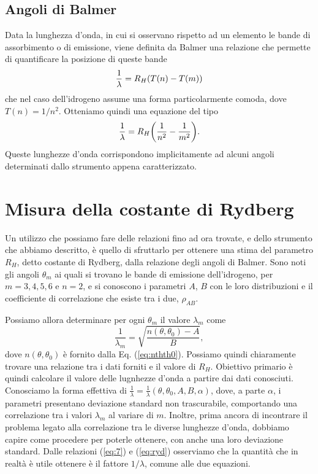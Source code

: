 \documentclass[a4paper,aps,12pt,tightenlines]{revtex4-2}
\begin{document}
\subsection{Angoli di Balmer}

Data la lunghezza d'onda, in cui si osservano rispetto ad un elemento le bande di assorbimento o di emissione, viene definita da Balmer una relazione che permette di quantificare la posizione di queste bande \begin{equation} \frac{1}{\lambda} = R_H \qty(T(n) - T(m)) \end{equation} che nel caso dell'idrogeno assume una forma particolarmente comoda, dove $T(n) = 1/n^2$. Otteniamo quindi una equazione del tipo \begin{equation} \frac{1}{\lambda} = R_H \qty(\frac{1}{n^2} - \frac{1}{m^2}). \label{eq:ryd}\end{equation} Queste lunghezze d'onda corrispondono implicitamente ad alcuni angoli determinati dallo strumento appena caratterizzato. 

\section{Misura della costante di Rydberg}

Un utilizzo che possiamo fare delle relazioni fino ad ora trovate, e dello strumento che abbiamo descritto, è quello di sfruttarlo per ottenere una stima del parametro $R_H$, detto costante di Rydberg, dalla relazione degli angoli di Balmer. Sono noti gli angoli $\theta_m$ ai quali si trovano le bande di emissione dell'idrogeno, per $m = 3, 4, 5, 6$ e $n=2$, e si conoscono i parametri $A$, $B$ con le loro distribuzioni e il coefficiente di correlazione che esiste tra i due, $\rho_{AB}$.

Possiamo allora determinare per ogni $\theta_m$ il valore $\lambda_m$ come \begin{equation} \frac{1}{\lambda_m} =  \sqrt{\frac{n(\theta, \theta_0) - A}{B}}, \label{eq:7}\end{equation} dove $n(\theta, \theta_0)$ è fornito dalla Eq. (\ref{eq:nthth0}). 
Possiamo quindi chiaramente trovare una relazione tra i dati forniti e il valore di $R_H$. 
Obiettivo primario è quindi calcolare il valore delle lugnhezze d'onda a partire dai dati conosciuti. Conosciamo la forma effettiva di $\frac{1}{\lambda} = \frac{1}{\lambda}(\theta, \theta_0, A, B, \alpha)$, dove, a parte $\alpha$, i parametri presentano deviazione standard non trascurabile, comportando una correlazione tra i valori $\lambda_m$ al variare di $m$. Inoltre, prima ancora di incontrare il problema legato alla correlazione tra le diverse lunghezze d'onda, dobbiamo capire come procedere per poterle ottenere, con anche una loro deviazione standard. Dalle relazioni (\ref{eq:7}) e (\ref{eq:ryd}) osserviamo che la quantità che in realtà è utile ottenere è il fattore $1/\lambda$, comune alle due equazioni. 
\end{document}
